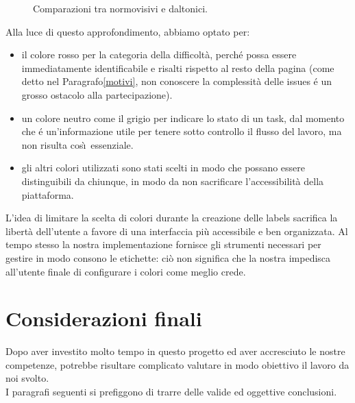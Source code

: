 \documentclass[12pt]{article} %
\begin{document}
\begin{figure}[H]
\caption{Comparazioni tra normovisivi e daltonici.}
\label{fig:daltonici}
\end{figure}

Alla luce di questo approfondimento, abbiamo optato per:
\begin{itemize}
\item il colore rosso per la categoria della difficolt\`a, perch\'e possa essere immediatamente identificabile e risalti rispetto al resto della pagina (come detto nel Paragrafo\ref{motivi}, non conoscere la complessit\`a delle issues \'e un grosso ostacolo alla partecipazione).
\item un colore neutro come il grigio per indicare lo stato di un task, dal momento che \'e un'informazione utile per tenere sotto controllo il flusso del lavoro, ma non risulta cos\`\i\ essenziale.
\item gli altri colori utilizzati sono stati scelti in modo che possano essere distinguibili da chiunque, in modo da non sacrificare l'accessibilit\`a della piattaforma.
\end{itemize}
L'idea di limitare la scelta di colori durante la creazione delle labels sacrifica la libert\`a dell'utente a favore di una interfaccia pi\`u accessibile e ben organizzata. Al tempo stesso la nostra implementazione fornisce gli strumenti necessari per gestire in modo consono le etichette: ci\`o non significa che la nostra impedisca all'utente finale di configurare i colori come meglio crede.

\newpage

\section{Considerazioni finali}
Dopo aver investito molto tempo in questo progetto ed aver accresciuto le nostre competenze, potrebbe risultare complicato valutare in modo obiettivo il lavoro da noi svolto.\\
I paragrafi seguenti si prefiggono di trarre delle valide ed oggettive conclusioni.
\end{document}
